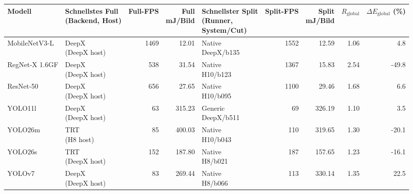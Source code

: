 \begin{tabular}{l l r r l r r r r}
\toprule
Modell & \shortstack{Schnellstes Full\\(Backend, Host)} & Full-FPS & \shortstack{Full\\mJ/Bild} & \shortstack{Schnellster Split\\(Runner,\\System/Cut)} & Split-FPS & \shortstack{Split\\mJ/Bild} & $R_{\mathrm{global}}$ & \shortstack{$\Delta E_{\mathrm{global}}$\\(\%)} \\
\midrule
MobileNetV3-L & \shortstack[l]{DeepX\\(DeepX host)} & 1469 & 12.01 & \shortstack[l]{Native\\DeepX/b135} & 1552 & 12.59 & 1.06 & 4.8 \\
RegNet-X 1.6GF & \shortstack[l]{DeepX\\(DeepX host)} & 538 & 31.54 & \shortstack[l]{Native\\H10/b123} & 1367 & 15.83 & 2.54 & -49.8 \\
ResNet-50 & \shortstack[l]{DeepX\\(DeepX host)} & 656 & 27.65 & \shortstack[l]{Native\\H10/b095} & 1100 & 29.46 & 1.68 & 6.6 \\
YOLO11l & \shortstack[l]{DeepX\\(DeepX host)} & 63 & 315.23 & \shortstack[l]{Generic\\DeepX/b511} & 69 & 326.19 & 1.10 & 3.5 \\
YOLO26m & \shortstack[l]{TRT\\(H8 host)} & 85 & 400.03 & \shortstack[l]{Native\\H10/b043} & 110 & 319.65 & 1.30 & -20.1 \\
YOLO26s & \shortstack[l]{TRT\\(DeepX host)} & 152 & 187.80 & \shortstack[l]{Native\\H8/b021} & 187 & 157.65 & 1.23 & -16.1 \\
YOLOv7 & \shortstack[l]{DeepX\\(DeepX host)} & 83 & 269.44 & \shortstack[l]{Native\\H8/b066} & 113 & 330.14 & 1.35 & 22.5 \\
\bottomrule
\end{tabular}
\endgroup
